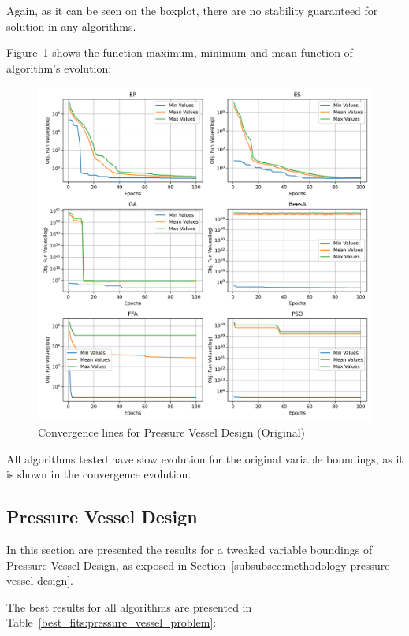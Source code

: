 \documentclass[conference]{IEEEtran}
\begin{document}
Again, as it can be seen on the boxplot, there are no stability guaranteed for solution
in any algorithms.



Figure~\ref{fig:pressure_vessel_problem_original_convergence} shows the
function maximum, minimum and mean function of algorithm's evolution:

\begin{figure}[H]
\centering
\caption{Convergence lines for Pressure Vessel Design (Original)}
\label{fig:pressure_vessel_problem_original_convergence}
\includegraphics[width=0.4 \textwidth]{images/pressure_vessel_problem_original_convergence.png}
\end{figure}

All algorithms tested have slow evolution for the original variable boundings, as it is shown in the convergence evolution.



\subsection{Pressure Vessel Design}
\label{subsec:pressure_vessel_problem}

In this section are presented the results for a tweaked variable boundings of Pressure Vessel Design,
as exposed in Section~\ref{subsubsec:methodology-pressure-vessel-design}.

The best results for all algorithms are presented in Table~\ref{best_fits:pressure_vessel_problem}:
\end{document}
